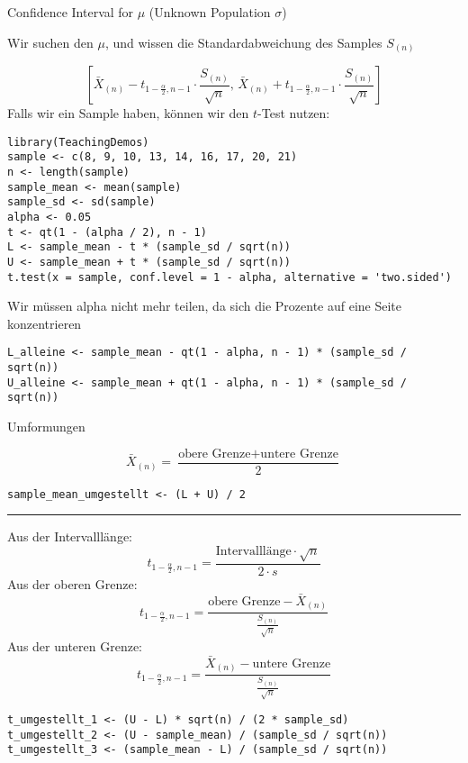 \begin{multicols*}{2}

\begin{center}
     \Large{Confidence Interval for $\mu$ (Unknown Population $\sigma$)}
\end{center}
\begin{center}
     \Large{Wir suchen den $\mu$, und wissen die Standardabweichung des Samples $S_{(n)}$}
\end{center}

$$
\left[ \bar{X}_{(n)} - t_{1 - \frac{\alpha}{2}, n-1} \cdot \frac{S_{(n)}}{\sqrt{n}}, \, \bar{X}_{(n)} + t_{1 - \frac{\alpha}{2}, n-1} \cdot \frac{S_{(n)}}{\sqrt{n}} \right]
$$
Falls wir ein Sample haben, können wir den \(t\)-Test nutzen:
\begin{lstlisting}
library(TeachingDemos)
sample <- c(8, 9, 10, 13, 14, 16, 17, 20, 21)
n <- length(sample)
sample_mean <- mean(sample)
sample_sd <- sd(sample)
alpha <- 0.05
t <- qt(1 - (alpha / 2), n - 1)
L <- sample_mean - t * (sample_sd / sqrt(n))
U <- sample_mean + t * (sample_sd / sqrt(n))
t.test(x = sample, conf.level = 1 - alpha, alternative = 'two.sided')
\end{lstlisting}

Wir müssen alpha nicht mehr teilen, da sich die Prozente auf eine Seite konzentrieren
\begin{lstlisting}
L_alleine <- sample_mean - qt(1 - alpha, n - 1) * (sample_sd / sqrt(n))
U_alleine <- sample_mean + qt(1 - alpha, n - 1) * (sample_sd / sqrt(n))
\end{lstlisting}
\begin{center}
     \Large{Umformungen}
\end{center}
$$
\bar{X}_{(n)} = \frac{\text{obere Grenze} + \text{untere Grenze}}{2}
$$
\begin{lstlisting}
sample_mean_umgestellt <- (L + U) / 2
\end{lstlisting}

\hrule
{}

Aus der Intervalllänge:
$$
t_{1 - \frac{\alpha}{2}, n-1} = \frac{\text{Intervalllänge} \cdot \sqrt{n}}{2 \cdot s}
$$
Aus der oberen Grenze:
$$
t_{1 - \frac{\alpha}{2}, n-1} = \frac{\text{obere Grenze} - \bar{X}_{(n)}}{\frac{S_{(n)}}{\sqrt{n}}}
$$
Aus der unteren Grenze:
$$
t_{1 - \frac{\alpha}{2}, n-1} = \frac{\bar{X}_{(n)} - \text{untere Grenze}}{\frac{S_{(n)}}{\sqrt{n}}}
$$
\begin{lstlisting}
t_umgestellt_1 <- (U - L) * sqrt(n) / (2 * sample_sd)
t_umgestellt_2 <- (U - sample_mean) / (sample_sd / sqrt(n))
t_umgestellt_3 <- (sample_mean - L) / (sample_sd / sqrt(n))
\end{lstlisting}
\columnbreak


\end{multicols*}
